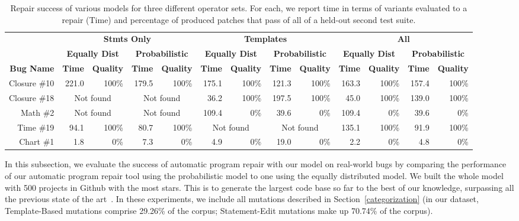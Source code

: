 \documentclass[conference]{IEEEtran}
\begin{document}
\begin{table}\centering
\begin{tabular}{r|rr|rr|rr|rr|rr|rr}
\toprule
  &\multicolumn{4}{c|}{\textbf{Stmts Only}} & \multicolumn{4}{c|}{\textbf{Templates}} & \multicolumn{4}{c}{\textbf{All}} \\  
  & \multicolumn{2}{c|}{\textbf{Equally Dist}} & \multicolumn{2}{c|}{\textbf{Probabilistic}} & \multicolumn{2}{c|}{\textbf{Equally Dist}} & \multicolumn{2}{c|}{\textbf{Probabilistic}} & \multicolumn{2}{c|}{\textbf{Equally Dist}} & 
\multicolumn{2}{c}{\textbf{Probabilistic}} \\

 \textbf{Bug Name} & \textbf{Time} & \textbf{Quality} &  \textbf{Time} & \textbf{Quality} &  \textbf{Time} & \textbf{Quality}&  \textbf{Time} & \textbf{Quality}&  \textbf{Time} & \textbf{Quality}&  \textbf{Time} & \textbf{Quality} \\\midrule

 Closure \#10 & {221.0}& {100\%} & {179.5} &{100\%} & {175.1}&{100\%} & {121.3}&{100\%} & {163.3}&{100\%} & {157.4}&{100\%} \\

 Closure \#18 & \multicolumn{2}{c|}{Not found} & \multicolumn{2}{c|}{Not found} & {36.2}&{100\%} & {197.5}&{100\%} & {45.0}&{100\%} & {139.0}&{100\%} \\

 Math \#2 & \multicolumn{2}{c|}{Not found} & \multicolumn{2}{c|}{Not found} & {109.4}&{0\%} & {39.6}&{0\%} & {109.4}&{0\%} & {39.6}&{0\%} \\

 Time \#19 & {94.1}&{100\%} & {80.7}&{100\%} & \multicolumn{2}{c|}{Not found} & \multicolumn{2}{c|}{Not found} & {135.1}&{100\%} & {91.9}&{100\%} \\

 Chart \#1 & {1.8}&{0\%} & {7.3}&{0\%} & {4.9}&{0\%} & {19.0}&{0\%} & {2.2}&{0\%} & {4.8}&{0\%} \\

\bottomrule
 
\end{tabular}
		\caption{Repair success of various models for three different operator
          sets.  For each, we report time in terms of variants evaluated to a
          repair (Time) and percentage of produced patches that pass of all of a
          held-out second test suite. \label{tab:singleLineBugs}}
\end{table}

In this subsection, we evaluate the success of automatic program repair with our
model on real-world bugs  by comparing the performance of our 
automatic program repair tool using the probabilistic model to one using the
equally distributed model.  
We built the whole model with 500
projects in Github with the most stars.
 This is to generate the largest code base so far to the best 
of our knowledge, surpassing all the previous state of the 
art~\cite{long16proph,Soto15,zhong15,martinez15,xuan16}. 
In these experiments, we include all mutations described in
Section~\ref{categorization} (in our dataset, Template-Based mutations comprise 29.26\% of the corpus; Statement-Edit mutations make up 70.74\% of the 
corpus).
\end{document}
